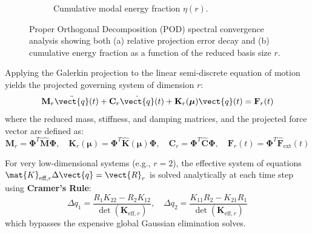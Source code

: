 \begin{figure}[htbp]
\begin{subfigure}{0.46\textwidth}
        \caption{Cumulative modal energy fraction $\eta(r)$.}
        \label{fig:pod_energy}
    \end{subfigure}
    \caption{Proper Orthogonal Decomposition (POD) spectral convergence analysis showing both (a) relative projection error decay and (b) cumulative energy fraction as a function of the reduced basis size $r$.}
    \label{fig:pod_energy_decay}
\end{figure}

Applying the Galerkin projection to the linear semi-discrete equation of motion yields the projected governing system of dimension $r$:
\begin{equation}
    \mathbf{M}_{r} \ddot{\vect{q}}(t) + \mathbf{C}_{r} \dot{\vect{q}}(t) + \mathbf{K}_{r}(\boldsymbol{\mu}) \vect{q}(t) = \mathbf{F}_{r}(t)
\end{equation}
where the reduced mass, stiffness, and damping matrices, and the projected force vector are defined as:
\begin{equation}
    \mathbf{M}_{r} = \boldsymbol{\Phi}^T \hat{\mathbf{M}} \boldsymbol{\Phi}, \quad \mathbf{K}_{r}(\boldsymbol{\mu}) = \boldsymbol{\Phi}^T \hat{\mathbf{K}}(\boldsymbol{\mu}) \boldsymbol{\Phi}, \quad \mathbf{C}_{r} = \boldsymbol{\Phi}^T \hat{\mathbf{C}} \boldsymbol{\Phi}, \quad \mathbf{F}_{r}(t) = \boldsymbol{\Phi}^T \hat{\mathbf{F}}_{\text{ext}}(t)
\end{equation}

For very low-dimensional systems (e.g., $r = 2$), the effective system of equations $\mat{K}_{\text{eff},r}\Delta \vect{q} = \vect{R}_r$ is solved analytically at each time step using \textbf{Cramer's Rule}:
\begin{equation}
    \Delta q_1 = \frac{R_1 K_{22} - R_2 K_{12}}{\det(\mathbf{K}_{\text{eff}, r})}, \quad \Delta q_2 = \frac{K_{11} R_2 - K_{21} R_1}{\det(\mathbf{K}_{\text{eff}, r})}
\end{equation}
which bypasses the expensive global Gaussian elimination solves.


